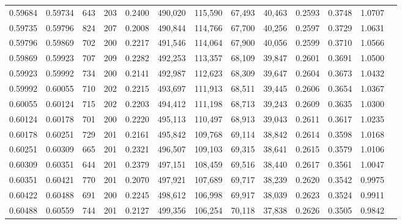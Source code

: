 \begin{tabular}{rrrrrrrrrrrrr}
0.59684 & 0.59734 &   643 & 203 &                                     0.2400 & 490,020 & 115,590 &  67,493 &  40,463 & 0.2593 & 0.3748 & 1.0707 \\
0.59735 & 0.59796 &   824 & 207 &                                     0.2008 & 490,844 & 114,766 &  67,700 &  40,256 & 0.2597 & 0.3729 & 1.0631 \\
0.59796 & 0.59869 &   702 & 200 &                                     0.2217 & 491,546 & 114,064 &  67,900 &  40,056 & 0.2599 & 0.3710 & 1.0566 \\
0.59869 & 0.59923 &   707 & 209 &                                     0.2282 & 492,253 & 113,357 &  68,109 &  39,847 & 0.2601 & 0.3691 & 1.0500 \\
0.59923 & 0.59992 &   734 & 200 &                                     0.2141 & 492,987 & 112,623 &  68,309 &  39,647 & 0.2604 & 0.3673 & 1.0432 \\
0.59992 & 0.60055 &   710 & 202 &                                     0.2215 & 493,697 & 111,913 &  68,511 &  39,445 & 0.2606 & 0.3654 & 1.0367 \\
0.60055 & 0.60124 &   715 & 202 &                                     0.2203 & 494,412 & 111,198 &  68,713 &  39,243 & 0.2609 & 0.3635 & 1.0300 \\
0.60124 & 0.60178 &   701 & 200 &                                     0.2220 & 495,113 & 110,497 &  68,913 &  39,043 & 0.2611 & 0.3617 & 1.0235 \\
0.60178 & 0.60251 &   729 & 201 &                                     0.2161 & 495,842 & 109,768 &  69,114 &  38,842 & 0.2614 & 0.3598 & 1.0168 \\
0.60251 & 0.60309 &   665 & 201 &                                     0.2321 & 496,507 & 109,103 &  69,315 &  38,641 & 0.2615 & 0.3579 & 1.0106 \\
0.60309 & 0.60351 &   644 & 201 &                                     0.2379 & 497,151 & 108,459 &  69,516 &  38,440 & 0.2617 & 0.3561 & 1.0047 \\
0.60351 & 0.60421 &   770 & 201 &                                     0.2070 & 497,921 & 107,689 &  69,717 &  38,239 & 0.2620 & 0.3542 & 0.9975 \\
0.60422 & 0.60488 &   691 & 200 &                                     0.2245 & 498,612 & 106,998 &  69,917 &  38,039 & 0.2623 & 0.3524 & 0.9911 \\
0.60488 & 0.60559 &   744 & 201 &                                     0.2127 & 499,356 & 106,254 &  70,118 &  37,838 & 0.2626 & 0.3505 & 0.9842 \\

\end{tabular}
